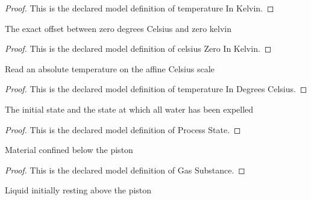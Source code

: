 \begin{proof}
  This is the declared model definition of temperature In Kelvin.
\end{proof}
\begin{definition}
  \label{def:physics:phyx-mini-0457:phyxminiproblems-problemphyxmini0457-celsiuszeroinkelvin}
  The exact offset between zero degrees Celsius and zero kelvin
\end{definition}
\begin{proof}
  This is the declared model definition of celsius Zero In Kelvin.
\end{proof}
\begin{definition}
  \label{def:physics:phyx-mini-0457:phyxminiproblems-problemphyxmini0457-temperatureindegreescelsius}
  Read an absolute temperature on the affine Celsius scale
\end{definition}
\begin{proof}
  This is the declared model definition of temperature In Degrees Celsius.
\end{proof}
\begin{definition}
  \label{def:physics:phyx-mini-0457:phyxminiproblems-problemphyxmini0457-processstate}
  The initial state and the state at which all water has been expelled
\end{definition}
\begin{proof}
  This is the declared model definition of Process State.
\end{proof}
\begin{definition}
  \label{def:physics:phyx-mini-0457:phyxminiproblems-problemphyxmini0457-gassubstance}
  Material confined below the piston
\end{definition}
\begin{proof}
  This is the declared model definition of Gas Substance.
\end{proof}
\begin{definition}
  \label{def:physics:phyx-mini-0457:phyxminiproblems-problemphyxmini0457-upperliquid}
  Liquid initially resting above the piston
\end{definition}
